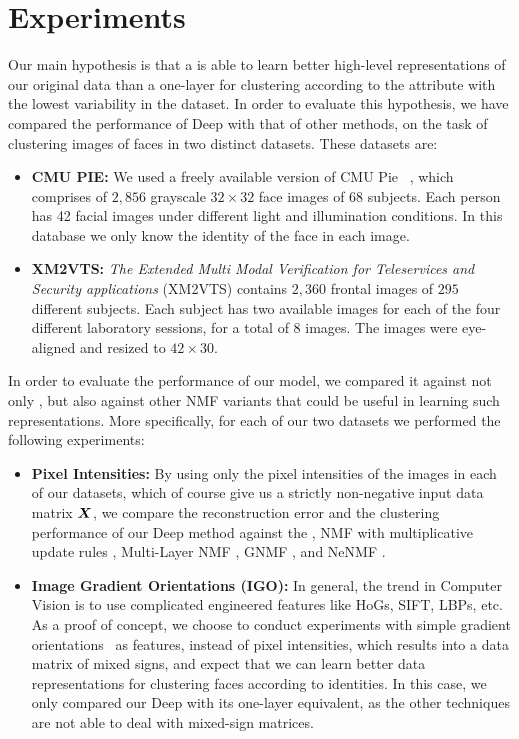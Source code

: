 \documentclass[10pt,journal,compsoc]{IEEEtran}
\begin{document}
\section{Experiments}\label{sec:experiments}
Our main hypothesis is that a \deepseminmf is able to learn better high-level representations of our original data than a one-layer \seminmf for clustering according to the attribute with the lowest variability in the dataset. In order to evaluate this hypothesis, we have compared the performance of Deep \seminmf with that of other methods, on the task of clustering images of faces in two distinct datasets. These datasets are:
\begin{itemize}
\item \textbf{CMU PIE: } We used a freely available version of CMU Pie ~\cite{PIEpami}, which comprises of $2,856$ grayscale $32\times32$ face images of 68 subjects. Each person has 42 facial
images under different light and illumination conditions. In this database we only know the identity of the face in each image.
\item \textbf{XM2VTS: } \textit{The Extended Multi Modal Verification for Teleservices and Security applications} (XM2VTS) \cite{messer1999xm2vtsdb} contains $2,360$ frontal images of $295$ different subjects. Each subject has two available images for each of the four different laboratory sessions, for a total of 8 images. The images were eye-aligned and resized to $42 \times 30$.
\end{itemize}

In order to evaluate the performance of our \deepseminmf model, we compared it against not only \seminmf \cite{ding2010convex}, but also against other NMF variants that could be useful in learning such representations.
More specifically, for each of our two datasets we performed the following experiments:
\begin{itemize}
\item \textbf{Pixel Intensities: } By using only the pixel intensities of the images in each of our datasets, which of course give us a strictly non-negative input data matrix $\boldsymbol X$, we compare the reconstruction error and the clustering performance of our Deep \seminmf method against the \seminmf, NMF with multiplicative update rules \cite{seung2001algorithms}, Multi-Layer NMF \cite{song2013hierarchical}, GNMF \cite{cai2011graph}, and NeNMF \cite{guan2012nenmf}.
\item \textbf{Image Gradient Orientations (IGO): } In general, the trend in Computer Vision is to use complicated engineered features like HoGs, SIFT, LBPs, etc. As a proof of concept, we choose to
conduct experiments with simple gradient orientations~\cite{tzimiropoulos2012subspace} as features, instead of pixel intensities, which results into a data matrix of mixed signs, and expect that we can learn better data
representations for clustering faces according to identities. In this case, we only compared our Deep \seminmf with its one-layer \seminmf equivalent, as the other techniques are not able to deal with
mixed-sign matrices.
\end{itemize}
\end{document}
